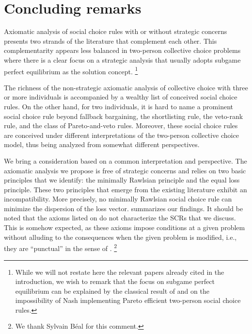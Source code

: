 \documentclass[version=3.21, pagesize, twoside=off, bibliography=totoc, DIV=calc, fontsize=12pt, a4paper]{scrartcl}
\begin{document}
\section{Concluding remarks}
\label{sec:concl}
Axiomatic analysis of social choice rules with or without strategic concerns presents two strands of the literature that complement each other. This complementarity appears less balanced in two-person collective choice problems where there is a clear focus on a strategic analysis that usually adopts subgame perfect equilibrium as the solution concept.%
\footnote{While we will not restate here the relevant papers already cited in the introduction, we wish to remark that the focus on subgame perfect equilibrium can be explained by the classical result of \cite{HurwiczSchmeidler78} and \cite{Maskin99} on the impossibility of Nash implementing Pareto efficient two-person social choice rules.} 

The richness of the non-strategic axiomatic analysis of collective choice with three or more individuals is accompanied by a wealthy list of conceived social choice rules. On the other hand, for two individuals, it is hard to name a prominent social choice rule beyond fallback bargaining, the shortlisting rule, the veto-rank rule, and the class of Pareto-and-veto rules. Moreover, these social choice rules are conceived under different interpretations of the two-person collective choice model, thus being analyzed from somewhat different perspectives.

We bring a consideration based on a common interpretation and perspective. The axiomatic analysis we propose is free of strategic concerns and relies on two basic principles that we identify: the minimally Rawlsian principle and the equal loss principle. These two principles that emerge from the existing literature exhibit an incompatibility. More precisely, no minimally Rawlsian social choice rule can minimize the dispersion of the loss vector.
 summarizes our findings. It should be noted that the axioms listed on  do not characterize the SCRs that we discuss. This is somehow expected, as these axioms impose conditions at a given problem without alluding to the consequences when the given problem is modified, i.e., they are “punctual” in the sense of \citet{thomson2012axiomatics}.%
\footnote{We thank Sylvain Béal for this comment.}
\end{document}

